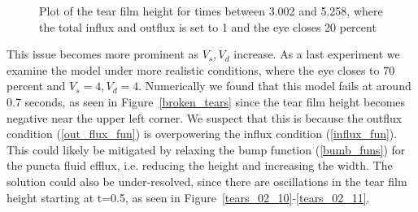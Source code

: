 \begin{figure}
	
	\caption{Plot of the tear film height for times between 3.002 and 5.258, where the total influx and outflux is set to 1 and the eye closes 20 percent}
	\label{tears_022}
\end{figure}

This issue becomes more prominent as $V_s,V_d$ increase. As a last experiment we examine the model under more realistic conditions, where the eye closes to 70 percent and $V_s=4,V_d=4$. Numerically we found that this model fails at around 0.7 seconds, as seen in Figure~\ref{broken_tears} since the tear film height becomes negative near the upper left corner. We suspect that this is because the outflux condition (\ref{out_flux_fun}) is overpowering the influx condition (\ref{influx_fun}). This could likely be mitigated by relaxing the bump function (\ref{bumb_funs}) for the puncta fluid efflux, i.e. reducing the height and increasing the width. The solution could also be under-resolved, since there are oscillations in the tear film height starting at t=0.5, as seen in Figure~\ref{tears_02_10}-\ref{tears_02_11}.


